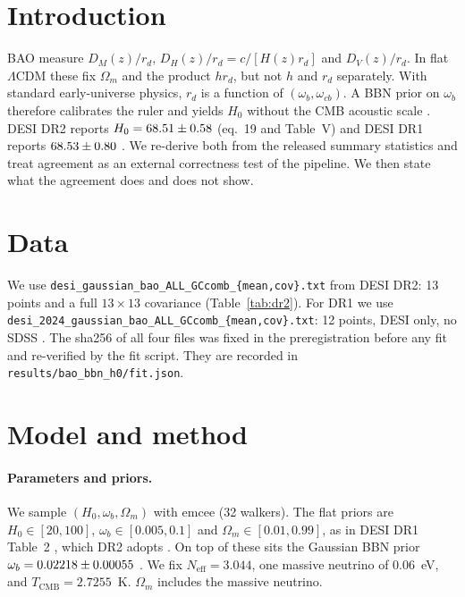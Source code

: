 \documentclass[11pt]{article}
\begin{document}
\section{Introduction}

BAO measure $D_M(z)/r_d$, $D_H(z)/r_d=c/[H(z)r_d]$ and
$D_V(z)/r_d$. In flat $\Lambda$CDM these fix $\Omega_m$ and the product
$h r_d$, but not $h$ and $r_d$ separately. With standard early-universe
physics, $r_d$ is a function of $(\omega_b,\omega_{cb})$. A BBN prior on
$\omega_b$ therefore calibrates the ruler and yields $H_0$ without the CMB
acoustic scale \cite{desi2025dr2,schoeneberg2022}. DESI DR2 reports
$H_0=68.51\pm0.58$ (eq.~19 and Table~V) and DESI DR1 reports
$68.53\pm0.80$ \cite{desi2024vi}. We re-derive both from the
released summary statistics and treat agreement as an external correctness
test of the pipeline. We then state what the agreement does and does not show.

\section{Data}

We use \texttt{desi\_gaussian\_bao\_ALL\_GCcomb\_\{mean,cov\}.txt} from
DESI DR2: 13 points and a full $13\times13$ covariance
(Table~\ref{tab:dr2}). For DR1 we use
\texttt{desi\_2024\_gaussian\_bao\_ALL\_GCcomb\_\{mean,cov\}.txt}: 12
points, DESI only, no SDSS \cite{desi2024vi}. The sha256 of all four files
was fixed in the preregistration before any fit and re-verified by the fit
script. They are recorded in \texttt{results/bao\_bbn\_h0/fit.json}.

\begin{table}[h]
\centering
\caption{DESI DR2 BAO data (values and $\sqrt{\mathrm{diag}\,C}$ read from the data files).}
\label{tab:dr2}

\end{table}

\begin{table}[h]
\centering
\caption{DESI DR1 BAO data used for the second check (read from the data files).}
\label{tab:dr1}

\end{table}

\section{Model and method}

\paragraph{Parameters and priors.}
We sample $(H_0,\omega_b,\Omega_m)$ with emcee (32 walkers). The flat
priors are $H_0\in[20,100]$, $\omega_b\in[0.005,0.1]$ and
$\Omega_m\in[0.01,0.99]$, as in DESI DR1 Table~2 \cite{desi2024vi}, which
DR2 adopts \cite{desi2025dr2}. On top of these sits the Gaussian BBN prior
$\omega_b=0.02218\pm0.00055$ \cite{desi2025dr2,schoeneberg2024}. We fix
$N_\mathrm{eff}=3.044$, one massive neutrino of 0.06~eV, and
$T_\mathrm{CMB}=2.7255$~K. $\Omega_m$ includes the massive neutrino.
\end{document}
